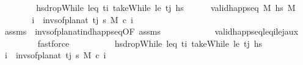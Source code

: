 \begin{isabellebody}
%
\isadelimproof
\ \ %
\endisadelimproof
%
\isatagproof
{}\isamarkupfalse%
\isanewline
\ \ \ \ \isamarkupfalse%
\ {\isacharquery}{\kern0pt}hs{\isacharprime}{\kern0pt}{\isacharequal}{\kern0pt}{\isachardoublequoteopen}dropWhile\ {\isacharparenleft}{\kern0pt}leq\ t\isactrlsub i{\isacharparenright}{\kern0pt}\ {\isacharparenleft}{\kern0pt}takeWhile\ {\isacharparenleft}{\kern0pt}le\ t\isactrlsub j{\isacharparenright}{\kern0pt}\ hs{\isacharparenright}{\kern0pt}{\isachardoublequoteclose}\isanewline
\ \ \ \ \isamarkupfalse%
\ {\isachardoublequoteopen}valid{\isacharunderscore}{\kern0pt}happ{\isacharunderscore}{\kern0pt}seq\ M\ {\isacharquery}{\kern0pt}hs{\isacharprime}{\kern0pt}\ M{\isachardoublequoteclose}\isanewline
\ \ \ \ \isamarkupfalse%
\ \isamarkupfalse%
\ {\isachardoublequoteopen}{\isasymforall}i\ {\isasymin}\ invs{\isacharunderscore}{\kern0pt}of{\isacharunderscore}{\kern0pt}plan{\isacharunderscore}{\kern0pt}at\ t\isactrlsub j\ {\isasympi}s{\isachardot}{\kern0pt}\ M\ \isactrlsup c{\isasymTTurnstile}\isactrlsub {\isacharequal}{\kern0pt}\ i{\isachardoublequoteclose}\isanewline
\ \ \ \ \ \ \isamarkupfalse%
\ assms\ \ invs{\isacharunderscore}{\kern0pt}of{\isacharunderscore}{\kern0pt}plan{\isacharunderscore}{\kern0pt}at{\isacharunderscore}{\kern0pt}ind{\isacharunderscore}{\kern0pt}happ{\isacharunderscore}{\kern0pt}seq{\isacharbrackleft}{\kern0pt}OF\ assms{\isacharbrackright}{\kern0pt}\isanewline
\ \ \ \ \ \ \ \ \ \ \ \ valid{\isacharunderscore}{\kern0pt}happ{\isacharunderscore}{\kern0pt}seq{\isacharunderscore}{\kern0pt}leq\isactrlsub i{\isacharunderscore}{\kern0pt}le\isactrlsub j{\isacharunderscore}{\kern0pt}aux{}\ \isanewline
\ \ \ \ \ \ \ \isamarkupfalse%
\ fastforce\isanewline
\ \ \isamarkupfalse%
\ \isanewline
\ \ \ \ \isamarkupfalse%
\ {\isacharquery}{\kern0pt}hs{\isacharprime}{\kern0pt}{\isacharequal}{\kern0pt}{\isachardoublequoteopen}dropWhile\ {\isacharparenleft}{\kern0pt}leq\ t\isactrlsub i{\isacharparenright}{\kern0pt}\ {\isacharparenleft}{\kern0pt}takeWhile\ {\isacharparenleft}{\kern0pt}le\ t\isactrlsub j{\isacharparenright}{\kern0pt}\ hs{\isacharparenright}{\kern0pt}{\isachardoublequoteclose}\isanewline
\ \ \ \ \isamarkupfalse%
\ {\isachardoublequoteopen}{\isasymforall}i\ {\isasymin}\ invs{\isacharunderscore}{\kern0pt}of{\isacharunderscore}{\kern0pt}plan{\isacharunderscore}{\kern0pt}at\ t\isactrlsub j\ {\isasympi}s{\isachardot}{\kern0pt}\ M\ \isactrlsup c{\isasymTTurnstile}\isactrlsub {\isacharequal}{\kern0pt}\ i{\isachardoublequoteclose}\isanewline

\end{isabellebody}
